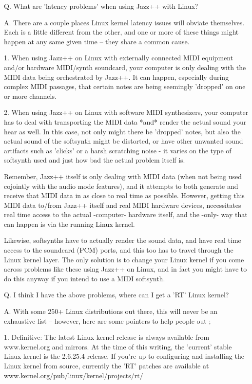 \documentclass[letterpaper]{report}
\begin{document}
Q. What are 'latency problems' when using Jazz++ with Linux?

A. There are a couple places Linux kernel latency issues will obviate
themselves. Each is a little different from the other, and one or more of these
things might happen at any same given time -- they share a common cause.

    1. When using Jazz++ on Linux with externally connected MIDI equipment
    and/or hardware MIDI/synth soundcard, your computer is only dealing with
    the MIDI data being orchestrated by Jazz++. It can happen, especially
    during complex MIDI passages, that certain notes are being seemingly
    'dropped' on one or more channels. 

    2. When using Jazz++ on Linux with software MIDI synthesizers, your
    computer has to deal with transporting the MIDI data *and* render the
    actual sound your hear as well. In this case, not only might there be
    'dropped' notes, but also the actual sound of the softsynth might be
    distorted, or have other unwanted sound artifacts such as 'clicks' or a
    harsh scratching noise - it varies on the type of softsynth used and
    just how bad the actual problem itself is.

Remember, Jazz++ itself is only dealing with MIDI data (when not being
used cojointly with the audio mode features), and it attempts to both
generate and receive that MIDI data in as close to real time as possible.
However, getting this MIDI data to/from Jazz++ itself and real MIDI hardware
devices, necessitates real time access to the actual -computer- hardware
itself, and the -only- way that can happen is via the running Linux kernel.

Likewise, softsynths have to actually render the sound data, and have real time
access to the soundcard (PCM) ports, and this too has to travel through the
Linux kernel layer. The only solution is to change your Linux kernel if you
come across problems like these using Jazz++ on Linux, and in fact you might
have to do this anyway if you intend to use a MIDI softsynth.


Q. I think I have the above problems, where can I get a 'RT' Linux kernel?

A. With some 250+ Linux distributions out there, this will never be an
exhaustive list -- however, here are some pointers to help people out ;

    1. Definitive: The latest Linux kernel release is always available from
    www.kernel.org and mirrors. At the time of this writing, the 'current'
    stable Linux kernel is the 2.6.25.4 release. If you're up to configuring
    and installing the Linux kernel from source, currently the 'RT' patches
    are available at www.kernel.org/pub/linux/kernel/projects/rt/  
\end{document}
